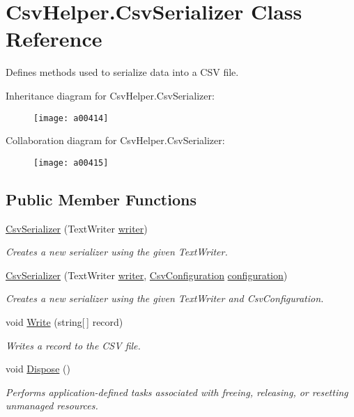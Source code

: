 \hypertarget{a00076}{\section{Csv\-Helper.\-Csv\-Serializer Class Reference}
\label{a00076}
}


Defines methods used to serialize data into a C\-S\-V file.  




Inheritance diagram for Csv\-Helper.\-Csv\-Serializer\-:
\nopagebreak
\begin{figure}[H]
\begin{center}
\leavevmode
\texttt{[image: a00414]}
\end{center}
\end{figure}


Collaboration diagram for Csv\-Helper.\-Csv\-Serializer\-:
\nopagebreak
\begin{figure}[H]
\begin{center}
\leavevmode
\texttt{[image: a00415]}
\end{center}
\end{figure}
\subsection*{Public Member Functions}
\begin{DoxyCompactItemize}
\item 
\hyperlink{a00076_a74ea10f7aaea0a478087d8ff6182f38c}{Csv\-Serializer} (Text\-Writer \hyperlink{a00076_adfb235fa2c868fc79c0376fd12fda767}{writer})
\begin{DoxyCompactList}\small\item\em Creates a new serializer using the given Text\-Writer. \end{DoxyCompactList}\item 
\hyperlink{a00076_ab14fe4a4f630ce97d57c27e2ee050fac}{Csv\-Serializer} (Text\-Writer \hyperlink{a00076_adfb235fa2c868fc79c0376fd12fda767}{writer}, \hyperlink{a00060}{Csv\-Configuration} \hyperlink{a00076_ae8c56ff97c0a797245f2205c486833ea}{configuration})
\begin{DoxyCompactList}\small\item\em Creates a new serializer using the given Text\-Writer and Csv\-Configuration. \end{DoxyCompactList}\item 
void \hyperlink{a00076_aefad906acd048863d3dd414651a44793}{Write} (string\mbox{[}$\,$\mbox{]} record)
\begin{DoxyCompactList}\small\item\em Writes a record to the C\-S\-V file. \end{DoxyCompactList}\item 
void \hyperlink{a00076_a9d0e8b3508b377a7f978da2394b09e36}{Dispose} ()
\begin{DoxyCompactList}\small\item\em Performs application-\/defined tasks associated with freeing, releasing, or resetting unmanaged resources. \end{DoxyCompactList}\end{DoxyCompactItemize}
